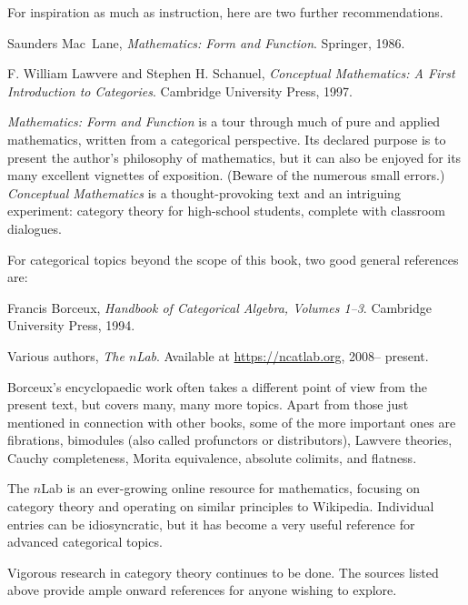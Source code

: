 For inspiration as much as instruction, here are two further
recommendations.
% 
\begin{citedsource}
Saunders Mac~Lane,
\emph{Mathematics: Form and Function}.
Springer,
1986.
\end{citedsource}
% 
\begin{citedsource}
F. William Lawvere and Stephen H. Schanuel,
\emph{Conceptual Mathematics: A First Introduction to Categories}.
Cambridge University Press,
1997.
\end{citedsource}
% 
\emph{Mathematics: Form and Function} is a tour through much of pure and
applied mathematics, written from a categorical perspective.  Its declared
purpose is to present the author's philosophy of mathematics, but it can
also be enjoyed for its many excellent vignettes of exposition.  (Beware of
the numerous small errors.)  \emph{Conceptual Mathematics} is a
thought-provoking text and an intriguing experiment: category theory for
high-school students, complete with classroom dialogues.

For categorical topics beyond the scope of this book, two good general
references are:
% 
\begin{citedsource}
Francis Borceux,
\emph{Handbook of Categorical Algebra, Volumes 1--3}.
Cambridge University Press, 
1994.
\end{citedsource}
% 
\begin{citedsource}
Various authors,
\emph{The $n$Lab}.
Available at \href{https://ncatlab.org}{\url{https://ncatlab.org}}, 2008--\linebreak
present.
\end{citedsource}
% 
Borceux's encyclopaedic work often takes a different point of view from the
present text, but covers many, many more topics.  Apart from those just
mentioned in connection with other books, some of the more important ones
are fibrations, bimodules (also called profunctors or distributors),
Lawvere theories, Cauchy completeness, Morita equivalence, absolute
colimits, and flatness.

The $n$Lab is an ever-growing online resource for mathematics, focusing on
category theory and operating on similar principles to Wikipedia.
Individual entries can be idiosyncratic, but it has become a very useful
reference for advanced categorical topics.

Vigorous research in category theory continues to be done.  The sources
listed above provide ample onward references for anyone wishing to explore.


